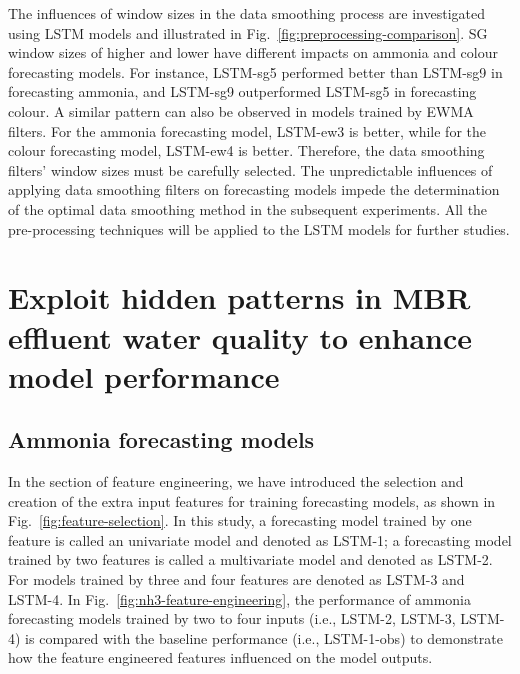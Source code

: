 The influences of window sizes in the data smoothing process are investigated using LSTM models and illustrated in Fig.~\ref{fig:preprocessing-comparison}. SG window sizes of higher and lower have different impacts on ammonia and colour forecasting models. For instance, LSTM-sg5 performed better than LSTM-sg9 in forecasting ammonia, and LSTM-sg9 outperformed LSTM-sg5 in forecasting colour. A similar pattern can also be observed in models trained by EWMA filters. For the ammonia forecasting model, LSTM-ew3 is better, while for the colour forecasting model, LSTM-ew4 is better. Therefore, the data smoothing filters' window sizes must be carefully selected. The unpredictable influences of applying data smoothing filters on forecasting models impede the determination of the optimal data smoothing method in the subsequent experiments. All the pre-processing techniques will be applied to the LSTM models for further studies.

\section{Exploit hidden patterns in MBR effluent water quality to enhance model performance}
\subsection{Ammonia forecasting models}
In the section of feature engineering, we have introduced the selection and creation of the extra input features for training forecasting models, as shown in Fig.~\ref{fig:feature-selection}. In this study, a forecasting model trained by one feature is called an univariate model and denoted as LSTM-1; a forecasting model trained by two features is called a multivariate model and denoted as LSTM-2. For models trained by three and four features are denoted as LSTM-3 and LSTM-4. In Fig.~\ref{fig:nh3-feature-engineering}, the performance of ammonia forecasting models trained by two to four inputs (i.e., LSTM-2, LSTM-3, LSTM-4) is compared with the baseline performance (i.e., LSTM-1-obs) to demonstrate how the feature engineered features influenced on the model outputs. 

